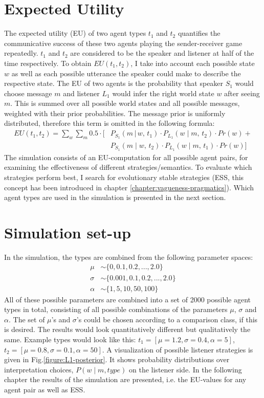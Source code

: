 \section{Expected Utility}
\label{sec:EU}
The expected utility (EU) of two agent types $t_1$ and $t_2$ quantifies the communicative success of these two agents playing the sender-receiver game repeatedly. $t_1$ and $t_2$ are considered to be the speaker and listener at half of the time respectively. To obtain $EU(t_1, t_2)$, I take into account each possible state $w$ as well as each possible utterance the speaker could make to describe the respective state. The EU of two agents is the probability that speaker $S_1$ would choose message $m$ and listener $L_1$ would infer the right world state $w$ after seeing $m$. This is summed over all possible world states and all possible messages, weighted with their prior probabilities. The message prior is uniformly distributed, therefore this term is omitted in the following formula:
\begin{align}
EU(t_1, t_2) = \sum \limits_{w} \sum \limits_{m} 0.5 \cdot \big[ &P_{S_1}(m\,|\,w ,\, t_1) \cdot P_{L_1}(w \mid m ,\, t_2) \cdot Pr(w) + \\
&P_{S_1}(m \mid w ,\, t_2) \cdot P_{L_1}(w \mid m ,\, t_1) \cdot Pr(w) \big] \nonumber
\end{align}
The simulation consists of an EU-computation for all possible agent pairs, for examining the effectiveness of different strategies/semantics. To evaluate which strategies perform best, I search for evolutionary stable strategies (ESS, this concept has been introduced in chapter \ref{chapter:vagueness-pragmatics}). Which agent types are used in the simulation is presented in the next section.

\section{Simulation set-up}

In the simulation, the types are combined from the following parameter spaces:
\begin{align*}
\mu &\sim \{ 0, 0.1, 0.2, ... , 2.0 \} \\
\sigma &\sim \{ 0.001, 0.1, 0.2, ... , 2.0 \} \\
\alpha &\sim \{ 1, 5, 10, 50, 100 \}
\end{align*}
All of these possible parameters are combined into a set of 2000 possible agent types in total, consisting of all possible combinations of the parameters $\mu$, $\sigma$ and $\alpha$. The set of $\mu$'s and $\sigma$'s could be chosen according to a comparison class, if this is desired. The results would look quantitatively different but qualitatively the same.
Example types would look like this: $t_1=[\mu=1.2, \sigma = 0.4, \alpha=5]$, $t_2=[\mu = 0.8, \sigma = 0.1, \alpha=50]$. A visualization of possible listener strategies is given in Fig.\ref{figure:L1-posterior}. It shows probability distributions over 
interpretation choices, $P(w \mid m, type)$ on the listener side. In the following chapter the results of the simulation are presented, i.e. the EU-values for any agent pair as well as ESS. 